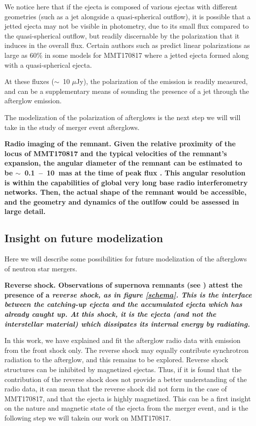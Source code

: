 We notice here that if the ejecta is composed of various ejectas with different geometries (such as a jet alongside a quasi-spherical outflow), it is possible that a jetted ejecta may not be visible in photometry, due to its small flux compared to the quasi-spherical outflow, but readily discernable by the polarization that it induces in the overall flux. Certain authors such as \citep{7} predict linear polarizations as large as 60\% in some models for MMT170817 where a jetted ejecta formed along with a quasi-spherical ejecta.

At these fluxes ($\sim$~10 $\mu$Jy), the polarization of the emission is readily measured, and can be a supplementary means of sounding the presence of a jet through the afterglow emission.

The modelization of the polarization of afterglows is the next step we will will take in the study of merger event afterglows.

\bf{Radio imaging of the remnant.} Given the relative proximity of the locus of MMT170817 and the typical velocities of the remnant's expansion, the angular diameter of the remnant can be estimated to be $\sim$~0.1~--~10~mas at the time of peak flux \citep{7}. This angular resolution is within the capabilities of global very long base radio interferometry networks. Then, the actual shape of the remnant would be accessible, and the geometry and dynamics of the outlfow could be assessed in large detail.

\subsection{Insight on future modelization}
\label{modelization}
Here we will describe some possibilities for future modelization of the afterglows of neutron star mergers.

\bf{Reverse shock.} Observations of supernova remnants (see \citep{56}) attest the presence of a \it{reverse shock}, as in figure \ref{schema}. This is the interface between the catching-up ejecta and the accumulated ejecta which has already caught up. At this shock, it is the ejecta (and not the interstellar material) which dissipates its internal energy by radiating.

In this work, we have explained and fit the afterglow radio data with emission from the front shock only. The reverse shock may equally contribute synchrotron radiation to the afterglow, and this remains to be explored. Reverse shock structures can be inhibited by magnetized ejectas. Thus, if it is found that the contribution of the reverse shock does not provide a better understanding of the radio data, it can mean that the reverse shock did not form in the case of MMT170817, and that the ejecta is highly magnetized. This can be a first insight on the nature and magnetic state of the ejecta from the merger event, and is the following step we will takein our work on MMT170817.


